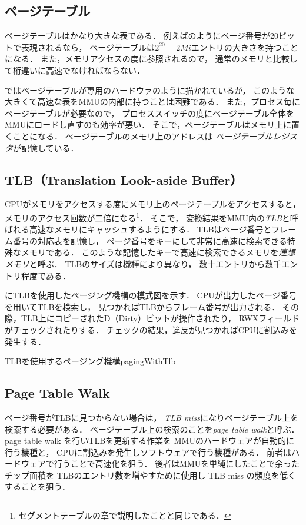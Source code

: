 \subsection{ページテーブル}
ページテーブルはかなり大きな表である．
例えばのようにページ番号が20ビットで表現されるなら，
ページテーブルは$2^{20}=2Mi$エントリの大きさを持つことになる．
また，メモリアクセスの度に参照されるので，
通常のメモリと比較して桁違いに高速でなければならない．

ではページテーブルが専用のハードウァのように描かれているが，
このような大きくて高速な表をMMUの内部に持つことは困難である．
また，プロセス毎にページテーブルが必要なので，
プロセススイッチの度にページテーブル全体をMMUにロードし直すのも効率が悪い．
そこで，ページテーブルはメモリ上に置くことになる．
ページテーブルのメモリ上のアドレスは
\emph{ページテーブルレジスタ}が記憶している．

\subsection{TLB（Translation Look-aside Buffer）}
CPUがメモリをアクセスする度にメモリ上のページテーブルをアクセスすると，
メモリのアクセス回数が二倍になる\footnote{
セグメントテーブルの章で説明したことと同じである．}．
そこで，
変換結果をMMU内の\emph{TLB}と呼ばれる高速なメモリにキャッシュするようにする．
TLBはページ番号とフレーム番号の対応表を記憶し，
ページ番号をキーにして非常に高速に検索できる特殊なメモリである．
このような記憶したキーで高速に検索できるメモリを\emph{連想メモリ}と呼ぶ．
TLBのサイズは機種により異なり，
数十エントリから数千エントリ程度である．

にTLBを使用したページング機構の模式図を示す．
CPUが出力したページ番号を用いてTLBを検索し，
見つかればTLBからフレーム番号が出力される．
その際，TLB上にコピーされたD（Dirty）ビットが操作されたり，
RWXフィールドがチェックされたりする．
チェックの結果，違反が見つかればCPUに割込みを発生する．

{TLBを使用するページング機構}{pagingWithTlb}

\subsection{Page Table Walk}
ページ番号がTLBに見つからない場合は，
\emph{TLB miss}になりページテーブル上を検索する必要がある．
ページテーブル上の検索のことを\emph{page table walk}と呼ぶ．
page table walk を行いTLBを更新する作業を
MMUのハードウェアが自動的に行う機種と，
CPUに割込みを発生しソフトウェアで行う機種がある．
前者はハードウェアで行うことで高速化を狙う．
後者はMMUを単純にしたことで余ったチップ面積を
TLBのエントリ数を増やすために使用し
TLB miss の頻度を低くすることを狙う．

